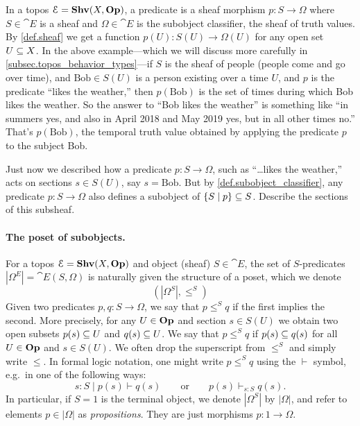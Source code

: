 \documentclass[7Sketches]{subfiles}
\begin{document}
In a topos $\cat{E}=\Shv(X,\Op)$, a predicate is a sheaf morphism $p\colon S\to\Omega$ where $S\in\cat{E}$ is a sheaf and $\Omega\in\cat{E}$ is the subobject classifier, the sheaf of truth values. By \cref{def.sheaf} we get a function $p(U)\colon S(U)\to\Omega(U)$ for any open set $U\ss X$. In the above example---which we will discuss more carefully in \cref{subsec.topos_behavior_types}---if $S$ is the sheaf of people (people come and go over time), and $\mathrm{Bob}\in S(U)$ is a person existing over a time $U$, and $p$ is the predicate ``likes the weather,'' then $p(\mathrm{Bob})$ is the set of times during which Bob likes the weather. So the answer to ``Bob likes the weather'' is something like ``in summers yes, and also in April 2018 and May 2019 yes, but in all other times no.'' That's $p(\mathrm{Bob})$, the temporal truth value obtained by applying the predicate $p$ to the subject Bob.

\begin{exercise}%
\label{exc.weather_bob}
Just now we described how a predicate $p\colon S\to\Omega$, such as ``\dots likes the weather,'' acts on sections $s\in S(U)$, say $s=\mathrm{Bob}$. But by \cref{def.subobject_classifier}, any predicate $p\colon S\to\Omega$ also defines a subobject of $\{S\mid p\}\ss S$. Describe the sections of this subsheaf.
\end{exercise}

\paragraph{The poset of subobjects.}
%

For a topos $\cat{E}=\Shv(X,\Op)$ and object (sheaf) $S\in\cat{E}$, the set of $S$-predicates $|\Omega^E|=\cat{E}(S,\Omega)$ is naturally given the structure of a poset, which we denote 
\begin{equation}%
\label{eqn.preorder_of_predicates}
	(|\Omega^S|, \leq^S)
\end{equation}
Given two predicates $p,q\colon S\to\Omega$, we say that $p\leq^S q$ if the first implies the second. More precisely, for any $U\in\Op$ and section $s\in S(U)$ we obtain two open subsets $p(s)\ss U$ and $q(s)\ss U$. We say that $p\leq^S q$ if $p(s)\ss q(s)$ for all $U\in\Op$ and $s\in S(U)$. We often drop the superscript from $\leq^S$ and simply write $\leq$. In formal logic notation, one might write $p\leq^Sq$ using the $\vdash$ symbol, e.g.\ in one of the following ways:
\[s:S\mid p(s)\vdash q(s)\qquad\text{or}\qquad p(s)\vdash_{s:S}q(s).\]
In particular, if $S=1$ is the terminal object, we denote $|\Omega^S|$ by $|\Omega|$, and refer to elements $p\in|\Omega|$ as \emph{propositions}. They are just morphisms $p\colon 1\to\Omega$.
\end{document}
